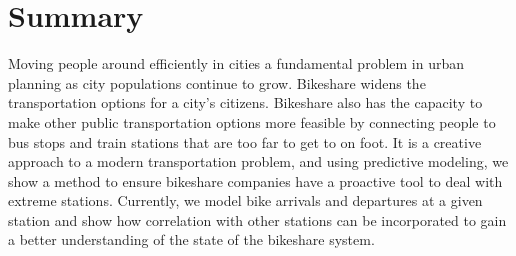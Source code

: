\documentclass{acm_proc_article-sp}
\begin{document}
\vspace{0.5cm}

\section{Summary}
Moving people around efficiently in cities a fundamental problem in urban planning as city populations continue to grow. Bikeshare widens the transportation options for a city's citizens. Bikeshare also has the capacity to make other public transportation options more feasible by connecting people to bus stops and train stations that are too far to get to on foot. It is a creative approach to a modern transportation problem, and using predictive modeling, we show a method to ensure bikeshare companies have a proactive tool to deal with extreme stations. Currently, we model bike arrivals and departures at a given station and show how correlation with other stations can be incorporated to gain a better understanding of the state of the bikeshare system. 



\end{document}
